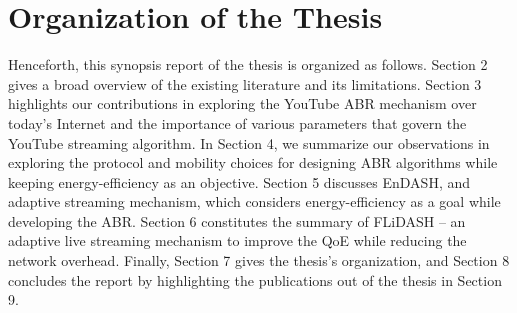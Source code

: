 \section{Organization of the Thesis}
Henceforth, this synopsis report of the thesis is organized as follows. Section 2 gives a broad overview of the existing literature and its limitations. Section 3 highlights our contributions in exploring the YouTube \ac{ABR} mechanism over today's Internet and the importance of various parameters that govern the YouTube streaming algorithm. In Section 4, we summarize our observations in exploring the protocol and mobility choices for designing \ac{ABR} algorithms while keeping energy-efficiency as an objective. Section  5 discusses EnDASH, and adaptive streaming mechanism, which considers energy-efficiency as a goal while developing the \ac{ABR}. Section 6 constitutes the summary of FLiDASH -- an adaptive live streaming mechanism to improve the \ac{QoE} while reducing the network overhead. Finally, Section 7 gives the thesis's organization, and Section 8 concludes the report by highlighting the publications out of the thesis in Section 9.


